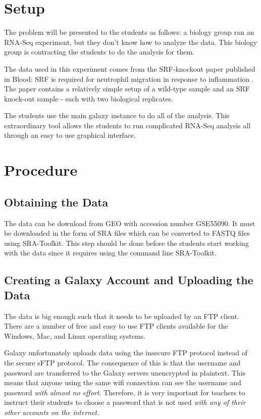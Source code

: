 \documentclass{report}
\begin{document}
\section{Setup}
The problem will be presented to the students as follows: a biology group ran an RNA-Seq experiment, but they don't know how to analyze the data. This biology group is contracting the students to do the analysis for them. 

The data used in this experiment comes from the SRF-knockout paper published in Blood: SRF is required for neutrophil migration in response to inflammation \cite{taylor2014srf}. The paper contains a relatively simple setup of a wild-type sample and an SRF knock-out sample - each with two biological replicates.

The students use the main galaxy instance to do all of the analysis. This extraordinary tool allows the students to run complicated RNA-Seq analysis all through an easy to use graphical interface.

\section{Procedure}
\subsection{Obtaining the Data}
The data can be download from GEO with accession number GSE55090. It must be downloaded in the form of SRA files which can be converted to FASTQ files using SRA-Toolkit. This step should be done before the students start working with the data since it requires using the command line SRA-Toolkit.

\subsection{Creating a Galaxy Account and Uploading the Data}
The data is big enough such that it needs to be uploaded by an FTP client. There are a number of free and easy to use FTP clients available for the Windows, Mac, and Linux operating systems. 

Galaxy unfortunately uploads data using the insecure FTP protocol instead of the secure sFTP protocol. The consequence of this is that the username and password are transferred to the Galaxy servers unencrypted in plaintext. This means that anyone using the same wifi connection can see the username and password \emph{with almost no effort}. Therefore, it is very important for teachers to instruct their students to choose a password that is not used \emph{with any of their other accounts on the internet}. 
\end{document}

